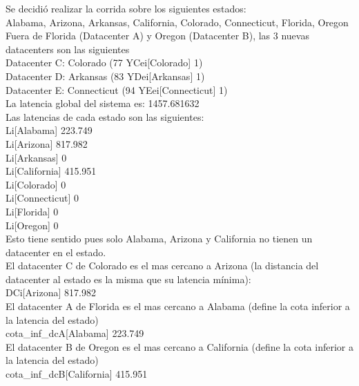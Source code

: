 \documentclass{article}
\begin{document}
Se decidi\'o realizar la corrida sobre los siguientes estados:
\smallskip\\
Alabama, Arizona, Arkansas, California, Colorado, Connecticut, Florida, Oregon
\bigskip\\
Fuera de Florida (Datacenter A) y Oregon (Datacenter B), las 3 nuevas datacenters son las siguientes
\bigskip\\
Datacenter C: Colorado        (77 YCei[Colorado]      1)
\smallskip\\
Datacenter D: Arkansas        (83 YDei[Arkansas]      1)     	
\smallskip\\
Datacenter E: Connecticut     (94 YEei[Connecticut]   1)   
\bigskip\\
La latencia global del sistema es: 1457.681632
\bigskip\\
Las latencias de cada estado son las siguientes:
\bigskip\\
Li[Alabama]       223.749        
\smallskip\\     
Li[Arizona]       817.982       
\smallskip\\      
Li[Arkansas]      0            
\smallskip\\ 
Li[California]    415.951     
\smallskip\\  
Li[Colorado]      0         
\smallskip\\    
Li[Connecticut]   0     
\smallskip\\        
Li[Florida]       0   
\smallskip\\          
Li[Oregon]        0             
\bigskip\\
Esto tiene sentido pues solo Alabama, Arizona y California no tienen un datacenter en el estado.
\bigskip\\
El datacenter C de Colorado es el mas cercano a Arizona (la distancia del datacenter al estado es la misma que su latencia m\'inima):
\smallskip\\
DCi[Arizona]          817.982 
\bigskip\\
El datacenter A de Florida es el mas cercano a Alabama (define la cota inferior a la latencia del estado) 
\smallskip\\
cota\_inf\_dcA[Alabama]   223.749  
\bigskip\\
El datacenter B de Oregon es el mas cercano a California (define la cota inferior a la latencia del estado) 
\smallskip\\
cota\_inf\_dcB[California] 415.951 
\bigskip\\


\newpage
\end{document}
